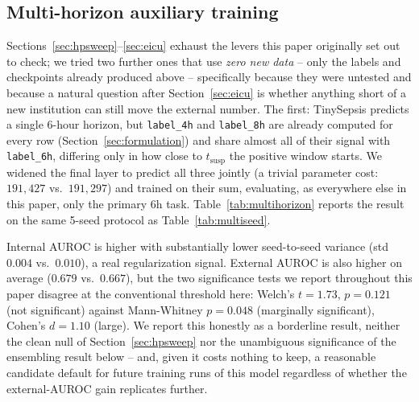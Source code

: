 \documentclass[11pt]{article}
\begin{document}
\subsection{Multi-horizon auxiliary training}
\label{sec:multihorizon}
Sections~\ref{sec:hpsweep}--\ref{sec:eicu} exhaust the levers this paper originally set out to check; we tried two further ones that use \emph{zero new data} -- only the labels and checkpoints already produced above -- specifically because they were untested and because a natural question after Section~\ref{sec:eicu} is whether anything short of a new institution can still move the external number. The first: TinySepsis predicts a single 6-hour horizon, but \texttt{label\_4h} and \texttt{label\_8h} are already computed for every row (Section~\ref{sec:formulation}) and share almost all of their signal with \texttt{label\_6h}, differing only in how close to $t_{\text{susp}}$ the positive window starts. We widened the final layer to predict all three jointly (a trivial parameter cost: $191{,}427$ vs.\ $191{,}297$) and trained on their sum, evaluating, as everywhere else in this paper, only the primary 6h task. Table~\ref{tab:multihorizon} reports the result on the same 5-seed protocol as Table~\ref{tab:multiseed}.

\begin{table}[t]
\centering
\caption{Multi-horizon (joint 4h/6h/8h) auxiliary training vs.\ single-horizon TinySepsis, 5-seed mean $\pm$ std, evaluated on the primary 6h task only.}
\label{tab:multihorizon}

\end{table}

Internal AUROC is higher with substantially lower seed-to-seed variance (std $0.004$ vs.\ $0.010$), a real regularization signal. External AUROC is also higher on average ($0.679$ vs.\ $0.667$), but the two significance tests we report throughout this paper disagree at the conventional threshold here: Welch's $t=1.73$, $p=0.121$ (not significant) against Mann-Whitney $p=0.048$ (marginally significant), Cohen's $d=1.10$ (large). We report this honestly as a borderline result, neither the clean null of Section~\ref{sec:hpsweep} nor the unambiguous significance of the ensembling result below -- and, given it costs nothing to keep, a reasonable candidate default for future training runs of this model regardless of whether the external-AUROC gain replicates further.
\end{document}
